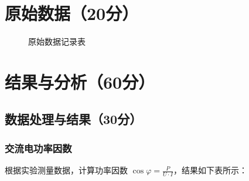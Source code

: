 \documentclass{../template/Report}%
\begin{document}
\begin{fullreportonly}
    \section{原始数据（20分）}
    \begin{figure}[H]
        \centering
        \caption{原始数据记录表}
    \end{figure}

    \section{结果与分析（60分）}

    \subsection{数据处理与结果（30分）}

    \subsubsection{交流电功率因数}

    根据实验测量数据，计算功率因数 $\cos\varphi = \frac{P}{U \cdot I}$，结果如下表所示：


\end{fullreportonly}
\end{document}
